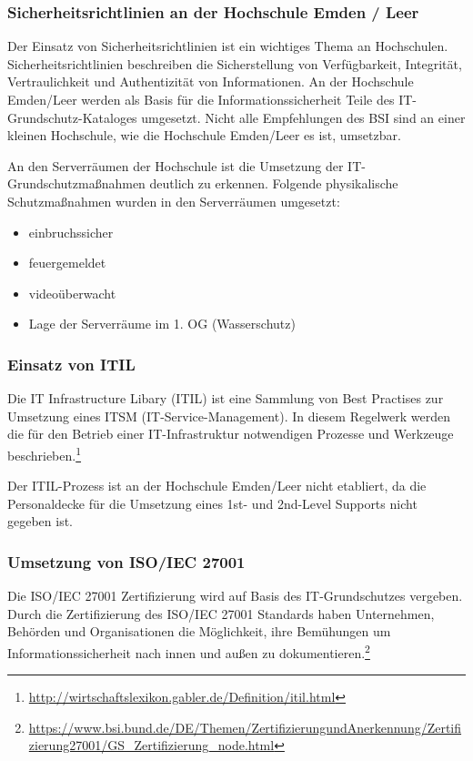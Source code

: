 \subsubsection{Sicherheitsrichtlinien an der Hochschule Emden / Leer}
Der Einsatz von Sicherheitsrichtlinien ist ein wichtiges Thema an Hochschulen. Sicherheitsrichtlinien beschreiben die Sicherstellung von Verfügbarkeit, Integrität, Vertraulichkeit und Authentizität von Informationen.
An der Hochschule Emden/Leer werden als Basis für die Informationssicherheit Teile des IT-Grundschutz-Kataloges umgesetzt. Nicht alle Empfehlungen des BSI sind an einer kleinen Hochschule, wie die Hochschule Emden/Leer es ist,  umsetzbar.

An den Serverräumen der Hochschule ist die Umsetzung der IT-Grundschutzmaßnahmen deutlich zu erkennen.
Folgende physikalische Schutzmaßnahmen wurden in den Serverräumen umgesetzt:

\begin{itemize}
	\item einbruchssicher
	\item feuergemeldet
	\item videoüberwacht
	\item Lage der Serverräume im 1. OG (Wasserschutz)
\end{itemize}

\subsubsection{Einsatz von ITIL}
Die IT Infrastructure Libary (ITIL) ist eine Sammlung von Best Practises zur Umsetzung eines ITSM (IT-Service-Management). In diesem Regelwerk werden die für den Betrieb einer IT-Infrastruktur notwendigen Prozesse und Werkzeuge beschrieben.\footnote{\url{http://wirtschaftslexikon.gabler.de/Definition/itil.html}}

Der ITIL-Prozess ist an der Hochschule Emden/Leer nicht etabliert, da die Personaldecke für die Umsetzung eines 1st- und 2nd-Level Supports nicht gegeben ist.

\subsubsection{Umsetzung von ISO/IEC 27001}
Die ISO/IEC 27001 Zertifizierung wird auf Basis des IT-Grundschutzes vergeben. Durch die Zertifizierung des ISO/IEC 27001 Standards haben Unternehmen, Behörden und Organisationen die Möglichkeit, ihre Bemühungen um Informationssicherheit nach innen und außen zu dokumentieren.\footnote{\url{https://www.bsi.bund.de/DE/Themen/ZertifizierungundAnerkennung/Zertifizierung27001/GS_Zertifizierung_node.html}}

